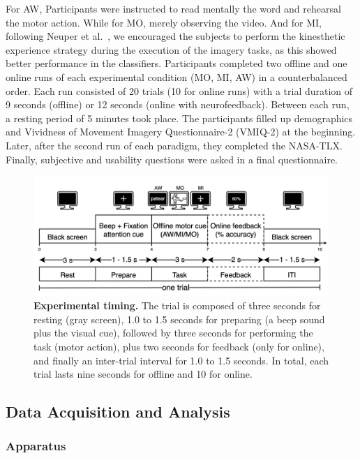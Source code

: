 \documentclass[10pt,letterpaper]{article}
\begin{document}
For AW, Participants were instructed to read mentally the word and rehearsal the motor action. While for MO, merely observing the video. And for MI, following Neuper et al.~\cite{Neuper38}, we encouraged the subjects to perform the kinesthetic experience strategy during the execution of the imagery tasks, as this showed better performance in the classifiers. Participants completed two offline and one online runs of each experimental condition (MO, MI, AW) in a counterbalanced order. Each run consisted of 20 trials (10 for online runs) with a trial duration of 9 seconds (offline) or 12 seconds (online with neurofeedback). Between each run, a resting period of 5 minutes took place. 
The participants filled up demographics and Vividness of Movement Imagery Questionnaire-2 (VMIQ-2) at the beginning. Later, after the second run of each paradigm, they completed the NASA-TLX. Finally, subjective and usability questions were asked in a final questionnaire. 

\begin{figure}[!h]
 \centering
 \includegraphics[width=\textwidth]{Figures/BCI_AW_MI_MO.png}
\caption{{\bf Experimental timing.}
The trial is composed of three seconds for resting (gray screen), 1.0 to 1.5 seconds for preparing (a beep sound plus the visual cue), followed by three seconds for performing the task (motor action), plus two seconds for feedback (only for online), and finally an inter-trial interval for 1.0 to 1.5 seconds. In total, each trial lasts nine seconds for offline and 10 for online.}
 \label{timing_protocol}
\end{figure}

 
\subsection{Data Acquisition and Analysis}

\subsubsection{Apparatus}
\end{document}
